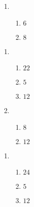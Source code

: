 \documentclass[12pt,twoside]{article}
\makeatletter
\def\emptycleardoublepage{\clearpage\if@twoside \ifodd\c@page\else
\thispagestyle{empty}%
\hbox{}\newpage\if@twocolumn\hbox{}\newpage\fi\fi\fi}
\makeatother
\begin{document}
\begin{multicols}{2}
\begin{enumerate}
\item \begin{enumerate}
\def \a{11}\def \dif{6}\def \b{5}
\item $\dif$
\def \a{2}\def \b{6}\def \ab{8}
\item $\ab$
\def \vshift{-1}\def \hshift{-4}\def \chang{0}\def \findval{-4}\def \yval{-1}
\end{enumerate}
\end{enumerate}\end{multicols}\emptycleardoublepage{}\graphicspath{{C:/Users/iainc/anaconda3/Randomizer/Sample Course/Sample Assessment 2/}}\begin{multicols}{2} \begin{enumerate}
\item \begin{enumerate}
\def \a{6}\def \b{16}\def \apb{22}
\item $\apb$
\def \a{13}\def \dif{5}\def \b{8}
\item $\dif$
\def \a{3}\def \b{9}\def \ab{12}
\item $\ab$
\def \vshift{-3}\def \hshift{2}\def \chang{0}\def \findval{2}\def \yval{-3}
\end{enumerate}

\item \begin{enumerate}
\def \a{14}\def \dif{8}\def \b{6}
\item $\dif$
\def \a{5}\def \b{7}\def \ab{12}
\item $\ab$
\def \vshift{1}\def \hshift{2}\def \chang{2}\def \findval{4}\def \yval{-3}
\end{enumerate}
\end{enumerate}\end{multicols}\emptycleardoublepage{}\graphicspath{{C:/Users/iainc/anaconda3/Randomizer/Sample Course/Sample Assessment 2/}}\begin{multicols}{2} \begin{enumerate}
\item \begin{enumerate}
\def \a{7}\def \b{17}\def \apb{24}
\item $\apb$
\def \a{11}\def \dif{5}\def \b{6}
\item $\dif$
\def \a{3}\def \b{9}\def \ab{12}
\item $\ab$
\def \vshift{-5}\def \hshift{-2}\def \chang{0}\def \findval{-2}\def \yval{-5}
\end{enumerate}


\end{enumerate}
\end{multicols}
\end{document}
